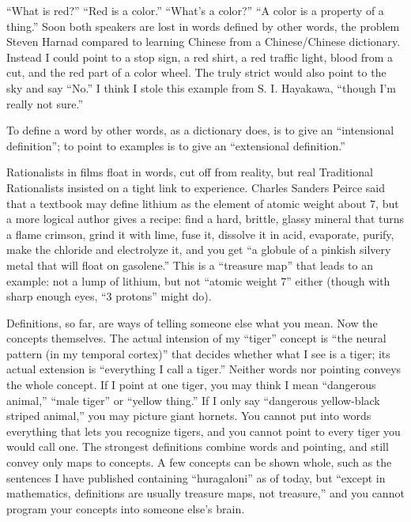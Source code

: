 
``What is red?'' ``Red is a color.'' ``What's a color?'' ``A color is a property of a thing.'' Soon both speakers are lost in words defined by other words, the problem Steven Harnad compared to learning Chinese from a Chinese/Chinese dictionary. Instead I could point to a stop sign, a red shirt, a red traffic light, blood from a cut, and the red part of a color wheel. The truly strict would also point to the sky and say ``No.'' I think I stole this example from S. I. Hayakawa, ``though I'm really not sure.'' 

To define a word by other words, as a dictionary does, is to give an ``intensional definition''; to point to examples is to give an ``extensional definition.'' 

Rationalists in films float in words, cut off from reality, but real Traditional Rationalists insisted on a tight link to experience. Charles Sanders Peirce said that a textbook may define lithium as the element of atomic weight about 7, but a more logical author gives a recipe: find a hard, brittle, glassy mineral that turns a flame crimson, grind it with lime, fuse it, dissolve it in acid, evaporate, purify, make the chloride and electrolyze it, and you get ``a globule of a pinkish silvery metal that will float on gasolene.'' This is a ``treasure map'' that leads to an example: not a lump of lithium, but not ``atomic weight 7'' either (though with sharp enough eyes, ``3 protons'' might do). 

Definitions, so far, are ways of telling someone else what you mean. Now the concepts themselves. The actual intension of my ``tiger'' concept is ``the neural pattern (in my temporal cortex)'' that decides whether what I see is a tiger; its actual extension is ``everything I call a tiger.''  Neither words nor pointing conveys the whole concept. If I point at one tiger, you may think I mean ``dangerous animal,'' ``male tiger'' or ``yellow thing.'' If I only say ``dangerous yellow-black striped animal,'' you may picture giant hornets.  You cannot put into words everything that lets you recognize tigers, and you cannot point to every tiger you would call one. The strongest definitions combine words and pointing, and still convey only maps to concepts. A few concepts can be shown whole, such as the sentences I have published containing ``huragaloni'' as of today, but ``except in mathematics, definitions are usually treasure maps, not treasure,'' and you cannot program your concepts into someone else's brain.

